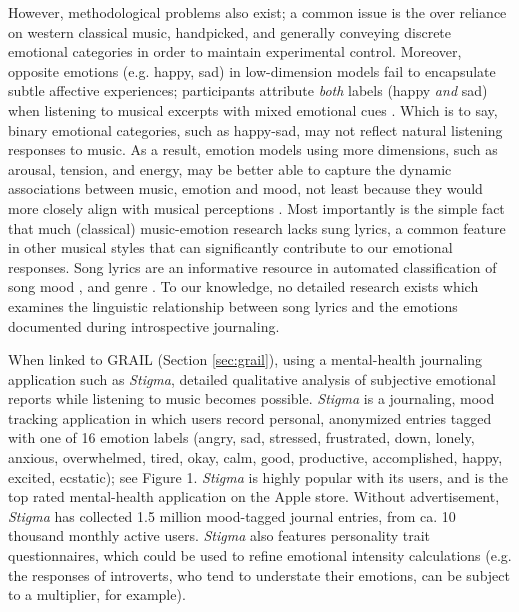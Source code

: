 \documentclass[a4paper]{article}
\begin{document}
However, methodological problems also exist; a common issue is the over reliance on western classical music, handpicked, and generally conveying discrete emotional categories in order to maintain experimental control. Moreover, opposite emotions (e.g. happy, sad) in low-dimension models fail to encapsulate subtle affective experiences; participants attribute \textit{both} labels (happy \textit{and} sad) when listening to musical excerpts with mixed emotional cues \cite{hunter2008mixed}. Which is to say, binary emotional categories, such as happy-sad, may not reflect natural listening responses to music. As a result, emotion models using more dimensions, such as arousal, tension, and energy, may be better able to capture the dynamic associations between music, emotion and mood, not least because they would more closely align with musical perceptions \cite{Eerola2011}. Most importantly is the simple fact that much (classical) music-emotion research lacks sung lyrics, a common feature in other musical styles that can significantly contribute to our emotional responses. Song lyrics are an informative resource in automated classification of song mood \cite{hu2009lyric}, and genre \cite{mayer2008rhyme}. To our knowledge, no detailed research exists which examines the linguistic relationship between song lyrics and the emotions documented during introspective journaling.

When linked to \Gls{GRAIL} (Section \ref{sec:grail}), using a mental-health journaling application such as \textit{Stigma}, detailed qualitative analysis of subjective emotional reports while listening to music becomes possible. \textit{Stigma} is a journaling, mood tracking application  in which users record personal, anonymized entries tagged with one of 16 emotion labels (angry, sad, stressed, frustrated, down, lonely, anxious, overwhelmed, tired, okay, calm, good, productive, accomplished, happy, excited, ecstatic); see Figure 1. \textit{Stigma} is highly popular with its users, and is the top rated mental-health application on the Apple store. Without advertisement, \textit{Stigma} has collected 1.5 million mood-tagged journal entries, from ca. 10 thousand monthly active users. \textit{Stigma} also features personality trait questionnaires, which could be used to refine emotional intensity calculations (e.g. the responses of introverts, who tend to understate their emotions, can be subject to a multiplier, for example).
\end{document}
